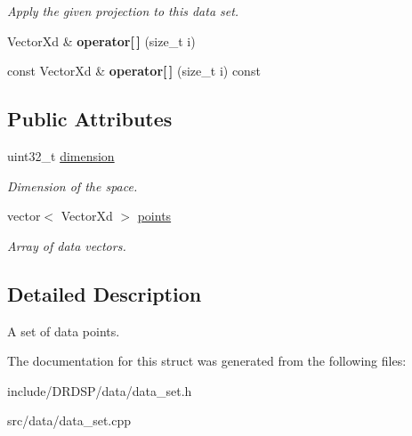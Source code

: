 \begin{DoxyCompactItemize}
\begin{DoxyCompactList}\small\item\em Apply the given projection to this data set. \end{DoxyCompactList}\item 
\hypertarget{struct_d_r_d_s_p_1_1_data_set_a6124959ad62a522b65cf6ad715166354}{Vector\-Xd \& {\bfseries operator\mbox{[}$\,$\mbox{]}} (size\-\_\-t i)}\label{struct_d_r_d_s_p_1_1_data_set_a6124959ad62a522b65cf6ad715166354}

\item 
\hypertarget{struct_d_r_d_s_p_1_1_data_set_aea3071fb03508e07e4d39056247eaaf9}{const Vector\-Xd \& {\bfseries operator\mbox{[}$\,$\mbox{]}} (size\-\_\-t i) const }\label{struct_d_r_d_s_p_1_1_data_set_aea3071fb03508e07e4d39056247eaaf9}

\end{DoxyCompactItemize}
\subsection*{Public Attributes}
\begin{DoxyCompactItemize}
\item 
\hypertarget{struct_d_r_d_s_p_1_1_data_set_aa2598262725329c137e03b8947638780}{uint32\-\_\-t \hyperlink{struct_d_r_d_s_p_1_1_data_set_aa2598262725329c137e03b8947638780}{dimension}}\label{struct_d_r_d_s_p_1_1_data_set_aa2598262725329c137e03b8947638780}

\begin{DoxyCompactList}\small\item\em Dimension of the space. \end{DoxyCompactList}\item 
\hypertarget{struct_d_r_d_s_p_1_1_data_set_ac486c907dea215957d503dc4dc9d76e3}{vector$<$ Vector\-Xd $>$ \hyperlink{struct_d_r_d_s_p_1_1_data_set_ac486c907dea215957d503dc4dc9d76e3}{points}}\label{struct_d_r_d_s_p_1_1_data_set_ac486c907dea215957d503dc4dc9d76e3}

\begin{DoxyCompactList}\small\item\em Array of data vectors. \end{DoxyCompactList}\end{DoxyCompactItemize}


\subsection{Detailed Description}
A set of data points. 

The documentation for this struct was generated from the following files\-:\begin{DoxyCompactItemize}
\item 
include/\-D\-R\-D\-S\-P/data/data\-\_\-set.\-h\item 
src/data/data\-\_\-set.\-cpp\end{DoxyCompactItemize}
